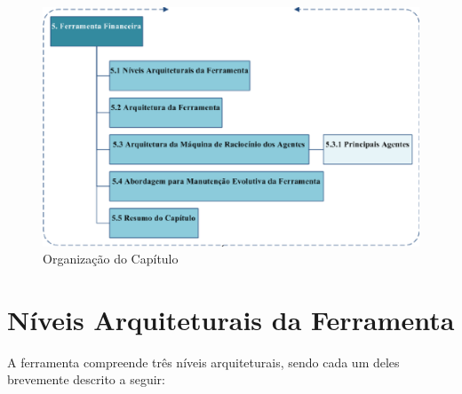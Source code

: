 \begin{figure}[h!]
\centering
\label{f10}
\includegraphics[width=1\textwidth]{figuras/cap5}
\caption{Organização do Capítulo}
\end{figure}
\FloatBarrier

\section{Níveis Arquiteturais da Ferramenta}
A ferramenta compreende três níveis arquiteturais, sendo cada um deles brevemente descrito a seguir:

